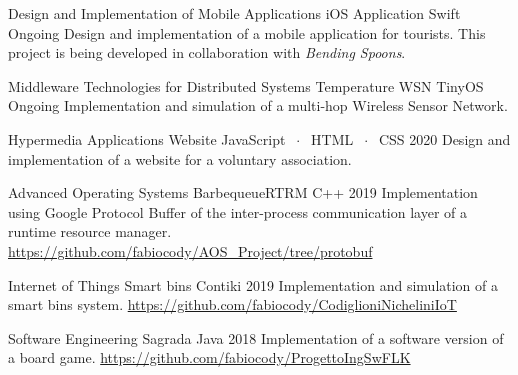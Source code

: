 

\begin{cventries}

\cventry
    {Design and Implementation of Mobile Applications}
    {iOS Application}
    {Swift}
    {Ongoing}
    {Design and implementation of a mobile application for tourists. This project is being developed in collaboration with \textit{Bending Spoons}.}
    
\cventry
    {Middleware Technologies for Distributed Systems}
    {Temperature WSN}
    {TinyOS}
    {Ongoing}
    {Implementation and simulation of a multi-hop Wireless Sensor Network.}
    
\cventry
    {Hypermedia Applications}
    {Website}
    {JavaScript $\;\cdot\;$ HTML $\;\cdot\;$ CSS}
    {2020}
    {Design and implementation of a website for a voluntary association.}

\iffalse
\cventry
    {Recommender System}
    {Kaggle competition}
    {Python}
    {2020}
    {Design and implementation of a system able to recommend relevant items to users of an e-commerce website. \href{https://github.com/Alenichel/CodiglioniNichelini\_recsys-polimi-2019}{https://github.com/Alenichel/CodiglioniNichelini\_recsys-polimi-2019}}
\fi
    
\cventry
    {Advanced Operating Systems}
    {BarbequeueRTRM}
    {C++}
    {2019}
    {Implementation using Google Protocol Buffer of the inter-process communication layer of a runtime resource manager. \href{https://github.com/fabiocody/AOS\_Project/tree/protobuf}{https://github.com/fabiocody/AOS\_Project/tree/protobuf}}
    
\cventry
    {Internet of Things}
    {Smart bins}
    {Contiki}
    {2019}
    {Implementation and simulation of a smart bins system. \qquad\qquad\qquad\qquad\qquad\qquad\qquad\qquad \href{https://github.com/fabiocody/CodiglioniNicheliniIoT}{https://github.com/fabiocody/CodiglioniNicheliniIoT}}
    
\cventry
    {Software Engineering}
    {Sagrada}
    {Java}
    {2018}
    {Implementation of a software version of a board game. \qquad\qquad\qquad\qquad\qquad\qquad\qquad\qquad\qquad\qquad\qquad\qquad\qquad \href{https://github.com/fabiocody/ProgettoIngSwFLK}{https://github.com/fabiocody/ProgettoIngSwFLK}}
\end{cventries}

